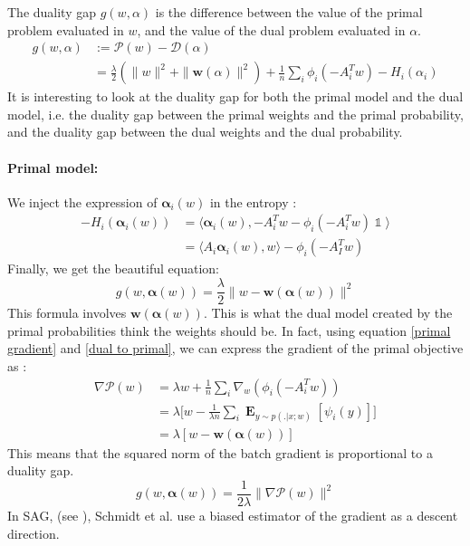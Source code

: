 \documentclass{article}
\DeclareMathOperator{\1}{\mathbb{1}}
\DeclareMathOperator{\E}{\mathbf{E}}
\begin{document}
The duality gap $g(w,\alpha)$ is the difference between the value  of the primal problem evaluated in $w$, and the value of the dual problem evaluated in $\alpha$.
\begin{align*}
	g(w,\alpha) 
	& := \mathscr P(w) - \mathscr D(\alpha) \\
	& = \frac{\lambda}{2}( \|w\|^2 + \|\bm w(\alpha) \|^2) 
	+ \frac{1}{n} \sum_i \phi_i(-A_i^Tw) - H_i(\alpha_i)
\end{align*}
It is interesting to look at the duality gap for both the primal model and the dual model, i.e. the duality gap between the primal weights and the primal probability, and the duality gap between the dual weights and the dual probability.

\paragraph{Primal model:}
We inject the expression of $\bm \alpha_i(w)$ in the entropy :
\begin{align*}
	- H_i(\bm \alpha_i(w)) 
	& = \langle \bm \alpha_i(w) , -A_i^Tw- \phi_i(-A_i^Tw) \1 \rangle \\
	& = \langle A_i \bm \alpha_i(w), w \rangle - \phi_i(-A_I^Tw)
\end{align*}
Finally, we get the beautiful equation:
\begin{equation}
	\label{primal duality gap}
	g(w,\bm \alpha(w)) = \frac{\lambda}{2} \|w- \bm w(\bm \alpha(w))\|^2
\end{equation}
This formula involves $\bm w(\bm \alpha(w))$.
This is what the dual model created by the primal probabilities think the weights should be. 
In fact, using equation \ref{primal gradient} and \ref{dual to primal}, we can express the gradient of the primal objective 	as :
\begin{align*}
	\nabla \mathscr P(w) 
	& = \lambda w + \frac{1}{n} \sum_i \nabla_w(\phi_i(-A_i^Tw)) \\
	& = \lambda \bigg [ w - \frac{1}{\lambda n} \sum_i \E_{y \sim p(. | x ; w)} [\psi_i(y)] \bigg ] \\
	& = \lambda [ w - \bm w(\bm \alpha(w))]
\end{align*}
This means that the squared norm of the batch gradient is proportional to a duality gap.
\begin{equation}
	g(w,\bm \alpha(w)) = \frac{1}{2 \lambda} \|\nabla \mathscr P(w)\|^2
\end{equation}
In SAG, (see \cite{schmidt_non-uniform_2015}), Schmidt et al. use a biased estimator of the gradient as a descent direction.
\end{document}
